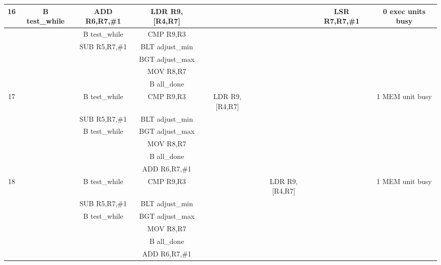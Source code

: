 \documentclass{article}
\begin{document}
{\begin{landscape}
\begin{longtable}{|c|c|c|c|c:c|c|c|}
    16 & B test\_while & ADD R6,R7,\#1 & LDR R9,[R4,R7] & & & LSR R7,R7,\#1 & 0 exec units busy \\ \hline
     & & B test\_while & CMP R9,R3 & & & & \\ \hline
     & & SUB R5,R7,\#1 & BLT adjust\_min & &  & & \\ \hline
     &  &  & BGT adjust\_max & &  & & \\ \hline
     &  &  & MOV R8,R7 &  &  &  & \\ \hline
     &  &  & B all\_done &  &  &  & \\ \hline \hline
     
    17 & & B test\_while & CMP R9,R3 & LDR R9,[R4,R7] & & & 1 MEM unit busy \\ \hline
     & & SUB R5,R7,\#1 & BLT adjust\_min & & & & \\ \hline
     & & B test\_while & BGT adjust\_max & &  & & \\ \hline
     &  &  & MOV R8,R7 & &  & & \\ \hline
     &  &  & B all\_done &  &  &  & \\ \hline
     &  &  & ADD R6,R7,\#1 &  &  &  & \\ \hline \hline
     
    18 & & B test\_while & CMP R9,R3 & & LDR R9,[R4,R7] & & 1 MEM unit busy \\ \hline
     & & SUB R5,R7,\#1 & BLT adjust\_min & & & & \\ \hline
     & & B test\_while & BGT adjust\_max & &  & & \\ \hline
     &  &  & MOV R8,R7 & &  & & \\ \hline
     &  &  & B all\_done &  &  &  & \\ \hline
     &  &  & ADD R6,R7,\#1 &  &  &  & \\ \hline \hline
     

\end{longtable}
\end{landscape}}
\end{document}
